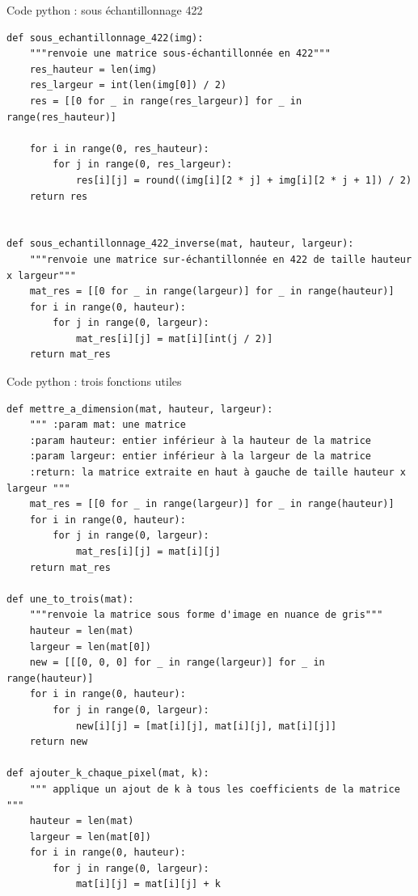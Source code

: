 \documentclass[xcolor=dvipsnames]{beamer}
\begin{document}
\begin{frame}[fragile]{Code python : sous échantillonnage 422}
    \begin{lstlisting}[style=pythonStyle]
def sous_echantillonnage_422(img):
    """renvoie une matrice sous-échantillonnée en 422"""
    res_hauteur = len(img)
    res_largeur = int(len(img[0]) / 2)
    res = [[0 for _ in range(res_largeur)] for _ in range(res_hauteur)]

    for i in range(0, res_hauteur):
        for j in range(0, res_largeur):
            res[i][j] = round((img[i][2 * j] + img[i][2 * j + 1]) / 2)
    return res


def sous_echantillonnage_422_inverse(mat, hauteur, largeur):
    """renvoie une matrice sur-échantillonnée en 422 de taille hauteur x largeur"""
    mat_res = [[0 for _ in range(largeur)] for _ in range(hauteur)]
    for i in range(0, hauteur):
        for j in range(0, largeur):
            mat_res[i][j] = mat[i][int(j / 2)]
    return mat_res
    \end{lstlisting}
\end{frame}

\begin{frame}[fragile]{Code python : trois fonctions utiles}
    \begin{lstlisting}[style=pythonStyle]
def mettre_a_dimension(mat, hauteur, largeur):
    """ :param mat: une matrice
    :param hauteur: entier inférieur à la hauteur de la matrice
    :param largeur: entier inférieur à la largeur de la matrice
    :return: la matrice extraite en haut à gauche de taille hauteur x largeur """
    mat_res = [[0 for _ in range(largeur)] for _ in range(hauteur)]
    for i in range(0, hauteur):
        for j in range(0, largeur):
            mat_res[i][j] = mat[i][j]
    return mat_res

def une_to_trois(mat):
    """renvoie la matrice sous forme d'image en nuance de gris"""
    hauteur = len(mat)
    largeur = len(mat[0])
    new = [[[0, 0, 0] for _ in range(largeur)] for _ in range(hauteur)]
    for i in range(0, hauteur):
        for j in range(0, largeur):
            new[i][j] = [mat[i][j], mat[i][j], mat[i][j]]
    return new

def ajouter_k_chaque_pixel(mat, k):
    """ applique un ajout de k à tous les coefficients de la matrice """
    hauteur = len(mat)
    largeur = len(mat[0])
    for i in range(0, hauteur):
        for j in range(0, largeur):
            mat[i][j] = mat[i][j] + k
    \end{lstlisting}
\end{frame}
\end{document}
